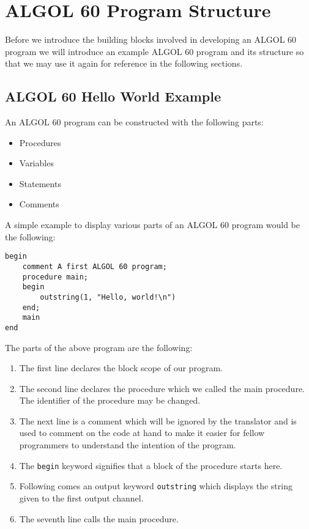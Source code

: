 \documentclass{article}
\begin{document}
\section{ALGOL 60 Program Structure}
Before we introduce the building blocks involved in developing an ALGOL 60 program we will introduce an example ALGOL 60 program and its structure so that we may use it again for reference in the following sections.

\subsection{ALGOL 60 Hello World Example}
An ALGOL 60 program can be constructed with the following parts:

\begin{itemize}
	\item Procedures
	\item Variables
	\item Statements
	\item Comments
\end{itemize}

A simple example to display various parts of an ALGOL 60 program would be the following:

\begin{lstlisting}[language={[60]algol}, caption={hello.alg program}, captionpos=b, label={hello.alg}]
begin
    comment A first ALGOL 60 program;
    procedure main;
    begin
        outstring(1, "Hello, world!\n")
    end;
    main
end
\end{lstlisting}

The parts of the above program are the following:

\begin{enumerate}
	\item The first line declares the block scope of our program.
	\item The second line declares the procedure which we called the main procedure. The identifier of the procedure may be changed.
	\item The next line is a comment which will be ignored by the translator and is used to comment on the code at hand to make it easier for fellow programmers to understand the intention of the program.
	\item The \texttt{begin} keyword signifies that a block of the procedure starts here.
	\item Following comes an output keyword \texttt{outstring} which displays the string given to the first output channel.
	\item The seventh line calls the main procedure.
\end{enumerate}
\end{document}
